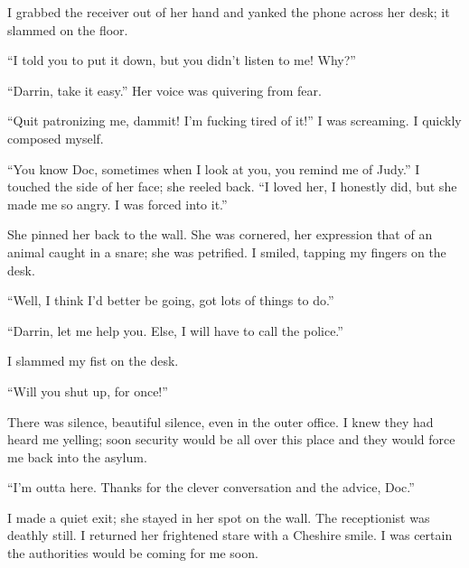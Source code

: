 I grabbed the receiver out of her hand and yanked the phone across her
desk; it slammed on the floor.

``I told you to put it down, but you didn't listen to me! Why?''

``Darrin, take it easy.'' Her voice was quivering from fear.

``Quit patronizing me, dammit! I'm fucking tired of it!'' I was
screaming. I quickly composed myself.

``You know Doc, sometimes when I look at you, you remind me of Judy.'' I
touched the side of her face; she reeled back. ``I loved her, I honestly
did, but she made me so angry. I was forced into it.''

She pinned her back to the wall. She was cornered, her expression that
of an animal caught in a snare; she was petrified. I smiled, tapping my
fingers on the desk.

``Well, I think I'd better be going, got lots of things to do.''

``Darrin, let me help you. Else, I will have to call the police.''

I slammed my fist on the desk.

``Will you shut up, for once!''

There was silence, beautiful silence, even in the outer office. I knew
they had heard me yelling; soon security would be all over this place
and they would force me back into the asylum.

``I'm outta here. Thanks for the clever conversation and the advice,
Doc.''

I made a quiet exit; she stayed in her spot on the wall. The
receptionist was deathly still. I returned her frightened stare with a
Cheshire smile. I was certain the authorities would be coming for me
soon.

